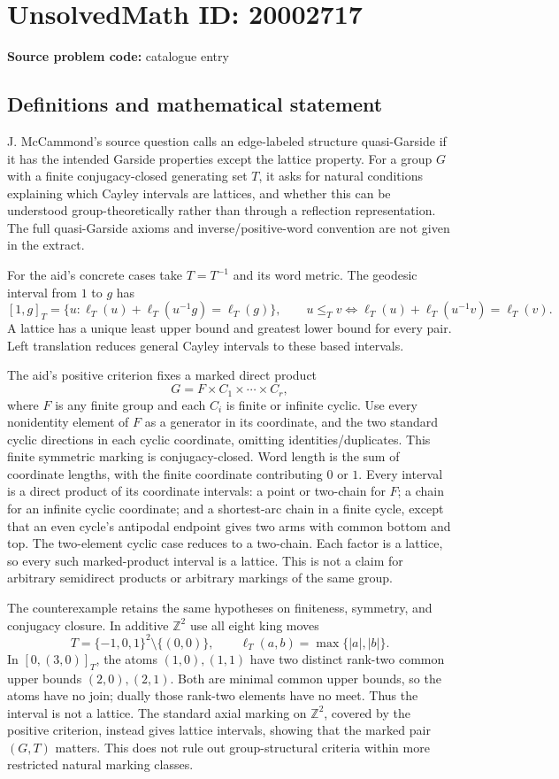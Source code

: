 \documentclass[11pt]{article}
\newcommand{\Z}{\mathbb{Z}}
\begin{document}
\section*{UnsolvedMath ID: 20002717}
\textbf{Source problem code:} catalogue entry
\subsection{Definitions and mathematical statement}
J. McCammond's source question calls an edge-labeled structure quasi-Garside if it has the intended Garside properties except the lattice property. For a group $G$ with a finite conjugacy-closed generating set $T$, it asks for natural conditions explaining which Cayley intervals are lattices, and whether this can be understood group-theoretically rather than through a reflection representation. The full quasi-Garside axioms and inverse/positive-word convention are not given in the extract.

For the aid's concrete cases take $T=T^{-1}$ and its word metric. The geodesic interval from $1$ to $g$ has
\[
 [1,g]_T=\{u:\ell_T(u)+\ell_T(u^{-1}g)=\ell_T(g)\},\qquad
 u\le_Tv\iff\ell_T(u)+\ell_T(u^{-1}v)=\ell_T(v).
\]
A lattice has a unique least upper bound and greatest lower bound for every pair. Left translation reduces general Cayley intervals to these based intervals.

The aid's positive criterion fixes a marked direct product
\[
 G=F\times C_1\times\cdots\times C_r,
\]
where $F$ is any finite group and each $C_i$ is finite or infinite cyclic. Use every nonidentity element of $F$ as a generator in its coordinate, and the two standard cyclic directions in each cyclic coordinate, omitting identities/duplicates. This finite symmetric marking is conjugacy-closed. Word length is the sum of coordinate lengths, with the finite coordinate contributing $0$ or $1$. Every interval is a direct product of its coordinate intervals: a point or two-chain for $F$; a chain for an infinite cyclic coordinate; and a shortest-arc chain in a finite cycle, except that an even cycle's antipodal endpoint gives two arms with common bottom and top. The two-element cyclic case reduces to a two-chain. Each factor is a lattice, so every such marked-product interval is a lattice. This is not a claim for arbitrary semidirect products or arbitrary markings of the same group.

The counterexample retains the same hypotheses on finiteness, symmetry, and conjugacy closure. In additive $\Z^2$ use all eight king moves
\[
 T=\{-1,0,1\}^2\setminus\{(0,0)\},\qquad\ell_T(a,b)=\max\{|a|,|b|\}.
\]
In $[0,(3,0)]_T$, the atoms $(1,0),(1,1)$ have two distinct rank-two common upper bounds $(2,0),(2,1)$. Both are minimal common upper bounds, so the atoms have no join; dually those rank-two elements have no meet. Thus the interval is not a lattice. The standard axial marking on $\Z^2$, covered by the positive criterion, instead gives lattice intervals, showing that the marked pair $(G,T)$ matters. This does not rule out group-structural criteria within more restricted natural marking classes.
\end{document}
